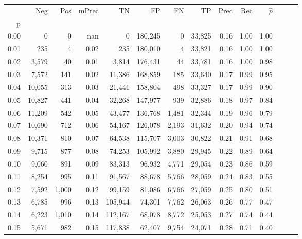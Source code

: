 \begin{tabular}{rrrrrrrrrrrrrr}
\toprule
{} &     Neg &    Pos & mPrec &       TN &       FP &      FN &      TP &  Prec &   Rec & $\hat{p}$ \\
p    &         &        &       &          &          &         &         &       &       &           \\
\midrule
0.00 &       0 &      0 &   nan &        0 &  180,245 &       0 &  33,825 &  0.16 &  1.00 &      1.00 \\
0.01 &     235 &      4 &  0.02 &      235 &  180,010 &       4 &  33,821 &  0.16 &  1.00 &      1.00 \\
0.02 &   3,579 &     40 &  0.01 &    3,814 &  176,431 &      44 &  33,781 &  0.16 &  1.00 &      0.98 \\
0.03 &   7,572 &    141 &  0.02 &   11,386 &  168,859 &     185 &  33,640 &  0.17 &  0.99 &      0.95 \\
0.04 &  10,055 &    313 &  0.03 &   21,441 &  158,804 &     498 &  33,327 &  0.17 &  0.99 &      0.90 \\
0.05 &  10,827 &    441 &  0.04 &   32,268 &  147,977 &     939 &  32,886 &  0.18 &  0.97 &      0.84 \\
0.06 &  11,209 &    542 &  0.05 &   43,477 &  136,768 &   1,481 &  32,344 &  0.19 &  0.96 &      0.79 \\
0.07 &  10,690 &    712 &  0.06 &   54,167 &  126,078 &   2,193 &  31,632 &  0.20 &  0.94 &      0.74 \\
0.08 &  10,371 &    810 &  0.07 &   64,538 &  115,707 &   3,003 &  30,822 &  0.21 &  0.91 &      0.68 \\
0.09 &   9,715 &    877 &  0.08 &   74,253 &  105,992 &   3,880 &  29,945 &  0.22 &  0.89 &      0.64 \\
0.10 &   9,060 &    891 &  0.09 &   83,313 &   96,932 &   4,771 &  29,054 &  0.23 &  0.86 &      0.59 \\
0.11 &   8,254 &    995 &  0.11 &   91,567 &   88,678 &   5,766 &  28,059 &  0.24 &  0.83 &      0.55 \\
0.12 &   7,592 &  1,000 &  0.12 &   99,159 &   81,086 &   6,766 &  27,059 &  0.25 &  0.80 &      0.51 \\
0.13 &   6,785 &    996 &  0.13 &  105,944 &   74,301 &   7,762 &  26,063 &  0.26 &  0.77 &      0.47 \\
0.14 &   6,223 &  1,010 &  0.14 &  112,167 &   68,078 &   8,772 &  25,053 &  0.27 &  0.74 &      0.44 \\
0.15 &   5,671 &    982 &  0.15 &  117,838 &   62,407 &   9,754 &  24,071 &  0.28 &  0.71 &      0.40 \\

\end{tabular}
